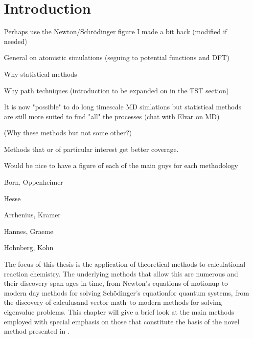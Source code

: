 \section{Introduction}
\label{sec:methods-introduction}

\bit
\item Perhaps use the Newton/Schr\"odinger figure I made a bit back (modified if needed)
\item General on atomistic simulations (seguing to potential functions and DFT)
\item Why statistical methods
\item Why path techniques (introduction to be expanded on in the TST section)
\item It is now "possible" to do long timescale MD simlations but statistical methods are still more suited to find "all" the processes (chat with Elvar on MD)
\item (Why these methods but not some other?)
\item Methods that or of particular interest get better coverage.

\item Would be nice to have a figure of each of the main guys for each methodology
\bit
\item Born, Oppenheimer
\item Hesse
\item Arrhenius, Kramer
\item Hannes, Graeme
\item Hohnberg, Kohn
\eit
\eit


The focus of this thesis is the application of theoretical methods to calculational reaction chemistry.
The underlying methods that allow this are numerous and their discovery span ages in time, from Newton's equations of motion\citemiss up to modern day methods for solving Sch\"odinger's equation\citemiss for quantum systems\cite{hohenberg-kohn-1964}, from the discovery of calculus\citemiss and vector math~\citemiss to modern methods for solving eigenvalue problems\citemiss.
This chapter will give a brief look at the main methods employed with special emphasis on those that constitute the basis of the novel method presented in .

